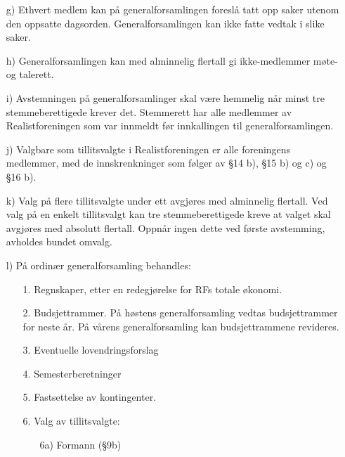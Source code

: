 \begin{itemize}
\item[g)] Ethvert medlem kan på generalforsamlingen foreslå tatt opp saker
utenom den oppsatte dagsorden. Generalforsamlingen kan ikke fatte
vedtak i slike saker.

\item[h)] Generalforsamlingen kan med alminnelig flertall gi ikke-medlemmer
møte- og talerett.

\item[i)] Avstemningen på generalforsamlinger skal være hemmelig når minst
tre stemmeberettigede krever det.  Stemmerett har alle medlemmer av
Realistforeningen som var innmeldt før innkallingen til
generalforsamlingen.

\item[j)] Valgbare som tillitsvalgte i Realistforeningen er alle foreningens
medlemmer, med de innskrenkninger som følger av §14 b), §15 b) og c) og 
§16 b).

\item[k)] Valg på flere tillitsvalgte under ett avgjøres med alminnelig
flertall.  Ved valg på en enkelt tillitsvalgt kan tre
stemmeberettigede kreve at valget skal avgjøres med absolutt
flertall.  Oppnår ingen dette ved første avstemming, avholdes bundet
omvalg.

\item[l)] På ordinær generalforsamling behandles:

        \begin{itemize}
        \item[1.] Regnskaper, etter en redegjørelse for RFs totale økonomi. 
        
        \item[2.] Budsjettrammer.  På høstens generalforsamling vedtas 
                  budsjettrammer for neste år.  På vårens generalforsamling 
                  kan budsjettrammene revideres.

        \item[3.] Eventuelle lovendringsforslag 

        \item[4.] Semesterberetninger 

        \item[5.] Fastsettelse av kontingenter. 

        \item[6.] Valg av tillitsvalgte: 

                \begin{itemize}
                \item[6a)] Formann (§9b) 
    

\end{itemize}
\end{itemize}
\end{itemize}
